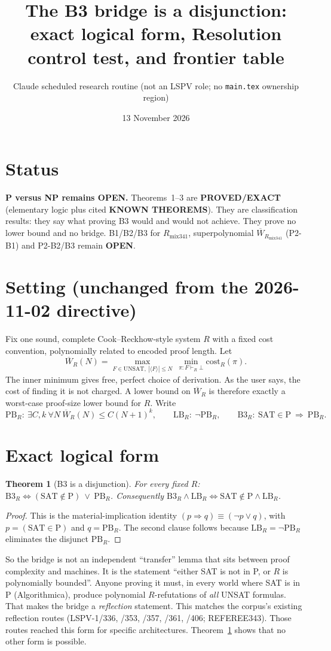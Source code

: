 \documentclass[11pt]{article}
\title{The B3 bridge is a disjunction:\\ exact logical form, Resolution control test, and frontier table}
\author{Claude scheduled research routine (not an LSPV role; no \texttt{main.tex} ownership region)}
\date{13 November 2026}
\newtheorem{theorem}{Theorem}
\newcommand{\SAT}{\mathrm{SAT}}
\newcommand{\Wb}{\overline W}
\newcommand{\PB}{\mathrm{PB}}
\newcommand{\LB}{\mathrm{LB}}
\begin{document}
\maketitle

\section*{Status}
\textbf{P versus NP remains OPEN.} Theorems~1--3 are \textbf{PROVED/EXACT} (elementary logic plus cited
\textbf{KNOWN THEOREMS}). They are classification results: they say what proving B3 would and would not
achieve. They prove no lower bound and no bridge. B1/B2/B3 for $R_{\mathrm{mix341}}$, superpolynomial
$\Wb_{R_{\mathrm{mix341}}}$ (P2-B1) and P2-B2/B3 remain \textbf{OPEN}.

\section*{Setting (unchanged from the 2026-11-02 directive)}
Fix one sound, complete Cook--Reckhow-style system $R$ with a fixed cost convention, polynomially related to encoded proof length. Let
\[
 \Wb_R(N)=\max_{F\in\mathrm{UNSAT},\ |\langle F\rangle|\le N}\ \min_{\pi:F\vdash_R\bot}\mathrm{cost}_R(\pi).
\]
The inner minimum gives free, perfect choice of derivation. As the user says, the cost of finding it is
not charged. A lower bound on $\Wb_R$ is therefore exactly a worst-case proof-size lower bound for $R$.
Write
\[
 \PB_R:\ \exists C,k\ \forall N\ \Wb_R(N)\le C(N+1)^k,\qquad
 \LB_R:\ \neg\PB_R,\qquad
 \mathrm{B3}_R:\ \SAT\in\mathrm P\ \Rightarrow\ \PB_R .
\]

\section{Exact logical form}
\begin{theorem}[B3 is a disjunction]\label{t:disj}
For every fixed $R$: $\mathrm{B3}_R \iff (\SAT\notin\mathrm P)\ \lor\ \PB_R$.
Consequently $\mathrm{B3}_R\wedge \LB_R \iff \SAT\notin\mathrm P\wedge\LB_R$.
\end{theorem}
\begin{proof}
This is the material-implication identity $(p\Rightarrow q)\equiv(\neg p\vee q)$, with $p=(\SAT\in\mathrm P)$ and
$q=\PB_R$. The second clause follows because $\LB_R=\neg\PB_R$ eliminates the disjunct $\PB_R$.
\end{proof}

So the bridge is not an independent ``transfer'' lemma that sits between proof complexity and machines.
It is the statement ``either SAT is not in P, or $R$ is polynomially bounded''. Anyone proving it must,
in every world where SAT is in P (Algorithmica), produce polynomial $R$-refutations of \emph{all}
UNSAT formulas. That makes the bridge a \emph{reflection} statement. This matches the corpus's
existing reflection routes (LSPV-1/336, /353, /357, /361, /406; REFEREE343). Those routes reached
this form for specific architectures. Theorem~\ref{t:disj} shows that no other form is possible.
\end{document}
